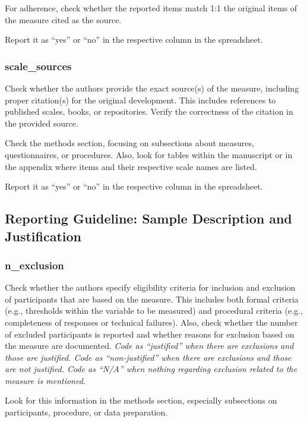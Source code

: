 {For adherence, check whether the reported items match 1:1 the original items of the measure cited as the source.

Report it as ``yes'' or ``no'' in the respective column in the spreadsheet.

\subsubsection*{scale\_sources}
\label{sources}
Check whether the authors provide the exact source(s) of the measure, including proper citation(s) for the original development. This includes references to published scales, books, or repositories. Verify the correctness of the citation in the provided source.

Check the methods section, focusing on subsections about measures, questionnaires, or procedures. Also, look for tables within the manuscript or in the appendix where items and their respective scale names are listed.

Report it as ``yes'' or ``no'' in the respective column in the spreadsheet.


\subsection*{Reporting Guideline: Sample Description and Justification}

\subsubsection*{n\_exclusion}
\label{exclusion}
Check whether the authors specify eligibility criteria for inclusion and exclusion of participants that are based on the measure. This includes both formal criteria (e.g., thresholds within the variable to be measured) and procedural criteria (e.g., completeness of responses or technical failures). Also, check whether the number of excluded participants is reported and whether reasons for exclusion based on the measure are documented. \textit{Code as ``justified'' when there are exclusions and those are justified. Code as ``non-justified'' when there are exclusions and those are not justified. Code as ``N/A'' when nothing regarding exclusion related to the measure is mentioned.}

Look for this information in the methods section, especially subsections on participants, procedure, or data preparation.

}
